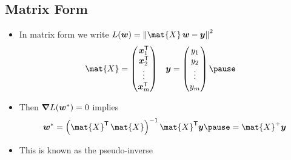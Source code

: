 
\begin{slide}
\section{Matrix Form}

\begin{PauseHighLight}
  \begin{itemize}
    \item In matrix form we write $L(\bm{w})= \left\| \mat{X}\,\bm{w} -
      \bm{y} \right\|^2$
    \begin{align*}
      \mat{X} &=
                \begin{pmatrix}
                  \bm{x}_1^\tr \\ \bm{x}_2^\tr \\ \vdots \\ \bm{x}_m^\tr
                \end{pmatrix}
              &
      \bm{y} &=
               \begin{pmatrix}
                 y_1 \\ y_2 \\ \vdots \\ y_m
               \end{pmatrix}\pause
    \end{align*}
  \item Then $\bm{\nabla} L(\bm{w}^*)=0$ implies
    \begin{align*}
      \bm{w}^* = \left(\mat{X}^\tr\,\mat{X}\right)^{-1} \mat{X}^\tr \bm{y}\pause
      = \mat{X}^{+} \bm{y}
    \end{align*}
  \item This is known as the pseudo-inverse\pause
  \end{itemize}
\end{PauseHighLight}

\end{slide}


